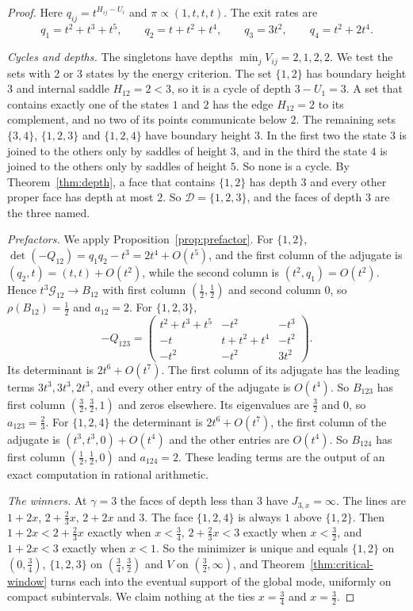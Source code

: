 \begin{proof}
Here $q_{ij}=t^{H_{ij}-U_i}$ and $\pi\propto(1,t,t,t)$. The exit rates are
\[
 q_1=t^2+t^3+t^5,\qquad q_2=t+t^2+t^4,\qquad q_3=3t^2,\qquad q_4=t^2+2t^4 .
\]

\emph{Cycles and depths.} The singletons have depths $\min_jV_{ij}=2,1,2,2$. We
test the sets with 2 or 3 states by the energy criterion. The set $\{1,2\}$
has boundary height $3$ and internal saddle $H_{12}=2<3$, so it is a cycle of
depth $3-U_1=3$. A set that contains exactly one of the states $1$ and $2$ has
the edge $H_{12}=2$ to its complement, and no two of its points communicate
below $2$. The remaining sets $\{3,4\}$, $\{1,2,3\}$ and $\{1,2,4\}$ have
boundary height $3$. In the first two the state $3$ is joined to the others
only by saddles of height $3$, and in the third the state $4$ is joined to the
others only by saddles of height $5$. So none is a cycle. By
Theorem~\ref{thm:depth}, a face that contains $\{1,2\}$ has depth $3$ and every
other proper face has depth at most $2$. So $\mathcal D=\{1,2,3\}$, and the
faces of depth $3$ are the three named.

\emph{Prefactors.} We apply Proposition~\ref{prop:prefactor}. For $\{1,2\}$,
$\det(-Q_{12})=q_1q_2-t^3=2t^4+O(t^5)$, and the first column of the adjugate is
$(q_2,t)=(t,t)+O(t^2)$, while the second column is $(t^2,q_1)=O(t^2)$. Hence
$t^3\mathcal G_{12}\to B_{12}$ with first column $(\frac12,\frac12)$ and second
column $0$, so $\rho(B_{12})=\frac12$ and $a_{12}=2$. For $\{1,2,3\}$,
\[
 -Q_{123}=\begin{pmatrix}t^2+t^3+t^5&-t^2&-t^3\\-t&t+t^2+t^4&-t^2\\-t^2&-t^2&3t^2\end{pmatrix}.
\]
Its determinant is $2t^6+O(t^7)$. The first column of its adjugate has the
leading terms $3t^3,3t^3,2t^3$, and every other entry of the adjugate is
$O(t^4)$. So $B_{123}$ has first column $(\frac32,\frac32,1)$ and zeros
elsewhere. Its eigenvalues are $\frac32$ and $0$, so $a_{123}=\frac23$. For
$\{1,2,4\}$ the determinant is $2t^6+O(t^7)$, the first column of the adjugate
is $(t^3,t^3,0)+O(t^4)$ and the other entries are $O(t^4)$. So $B_{124}$ has
first column $(\frac12,\frac12,0)$ and $a_{124}=2$. These leading terms are the
output of an exact computation in rational arithmetic.

\emph{The winners.} At $\gamma=3$ the faces of depth less than $3$ have
$J_{3,x}=\infty$. The lines are $1+2x$, $2+\frac23x$, $2+2x$ and $3$. The face
$\{1,2,4\}$ is always $1$ above $\{1,2\}$. Then $1+2x<2+\frac23x$ exactly when
$x<\frac34$, $2+\frac23x<3$ exactly when $x<\frac32$, and $1+2x<3$ exactly
when $x<1$. So the minimizer is unique and equals $\{1,2\}$ on $(0,\frac34)$,
$\{1,2,3\}$ on $(\frac34,\frac32)$ and $V$ on $(\frac32,\infty)$, and
Theorem~\ref{thm:critical-window} turns each into the eventual support of the
global mode, uniformly on compact subintervals. We claim nothing at the ties
$x=\frac34$ and $x=\frac32$.


\end{proof}
